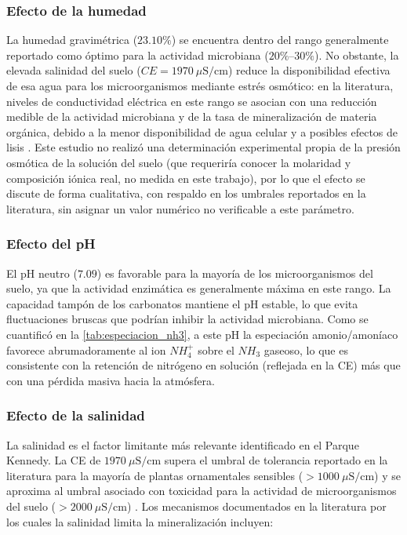 \documentclass[fleqn]{jaes}
\begin{document}
\subsubsection{Efecto de la humedad}

La humedad gravimétrica ($23.10\%$) se encuentra dentro del rango generalmente reportado como óptimo para la actividad microbiana ($20\%$--$30\%$). No obstante, la elevada salinidad del suelo ($CE = 1970~\mu\text{S/cm}$) reduce la disponibilidad efectiva de esa agua para los microorganismos mediante estrés osmótico: en la literatura, niveles de conductividad eléctrica en este rango se asocian con una reducción medible de la actividad microbiana y de la tasa de mineralización de materia orgánica, debido a la menor disponibilidad de agua celular y a posibles efectos de lisis \cite{Rath2015, Setia2025}. Este estudio no realizó una determinación experimental propia de la presión osmótica de la solución del suelo (que requeriría conocer la molaridad y composición iónica real, no medida en este trabajo), por lo que el efecto se discute de forma cualitativa, con respaldo en los umbrales reportados en la literatura, sin asignar un valor numérico no verificable a este parámetro.

\subsubsection{Efecto del pH}

El pH neutro ($7.09$) es favorable para la mayoría de los microorganismos del suelo, ya que la actividad enzimática es generalmente máxima en este rango. La capacidad tampón de los carbonatos mantiene el pH estable, lo que evita fluctuaciones bruscas que podrían inhibir la actividad microbiana. Como se cuantificó en la \cref{tab:especiacion_nh3}, a este pH la especiación amonio/amoníaco favorece abrumadoramente al ion $NH_4^+$ sobre el $NH_3$ gaseoso, lo que es consistente con la retención de nitrógeno en solución (reflejada en la CE) más que con una pérdida masiva hacia la atmósfera.

\subsubsection{Efecto de la salinidad}

La salinidad es el factor limitante más relevante identificado en el Parque Kennedy. La CE de $1970~\mu\text{S/cm}$ supera el umbral de tolerancia reportado en la literatura para la mayoría de plantas ornamentales sensibles ($> 1000~\mu\text{S/cm}$) y se aproxima al umbral asociado con toxicidad para la actividad de microorganismos del suelo ($> 2000~\mu\text{S/cm}$) \cite{Allen2020}. Los mecanismos documentados en la literatura por los cuales la salinidad limita la mineralización incluyen:
\end{document}
